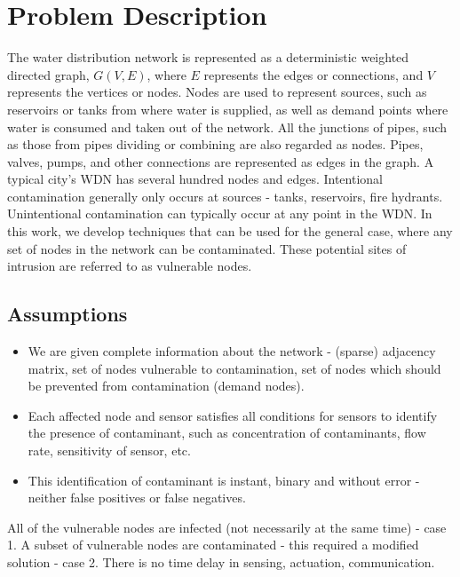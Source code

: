 \documentclass[authoryear,preprint,review,12pt]{elsarticle}
\begin{document}
\section{Problem Description}

The water distribution network is represented as a deterministic weighted directed graph,
$G(V,E)$, where $E$ represents the edges or connections, and $V$ represents the vertices or
nodes.
Nodes are used to represent sources, such as reservoirs or tanks from where water is supplied,
as well as demand points where water is consumed and taken out of the network.
All the junctions of pipes, such as those from pipes dividing or combining are also regarded as nodes.
Pipes, valves, pumps, and other connections are represented as edges in the graph.
A typical city's WDN has several hundred nodes and edges.
Intentional contamination generally only occurs at sources - tanks, reservoirs, fire hydrants.
Unintentional contamination can typically occur at any point in the WDN.
In this work, we develop techniques that can be used for the general case, where any set of nodes in the network can be contaminated.
These potential sites of intrusion are referred to as vulnerable nodes.

\subsection{Assumptions}
\begin{itemize}
\item We are given complete information about the network - (sparse) adjacency matrix,
set of nodes vulnerable to contamination,
set of nodes which should be prevented from contamination (demand nodes).
\item Each affected node and sensor satisfies all conditions for sensors to identify
the presence of contaminant, such as concentration of contaminants, flow rate, sensitivity of sensor, etc.\\
\item This identification of contaminant is instant, binary and without error - neither false positives or false negatives.
\end{itemize}
All of the vulnerable nodes are infected (not necessarily at the same time) - case 1.
A subset of vulnerable nodes are contaminated - this required a modified solution - case 2.
There is no time delay in sensing, actuation, communication.
\end{document}
